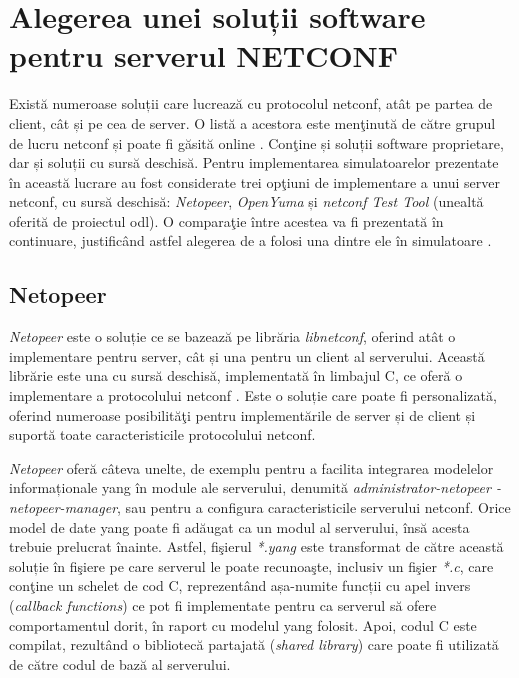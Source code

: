 \section{Alegerea unei soluții software pentru serverul NETCONF}

Există numeroase soluții care lucrează cu protocolul \gls{netconf}, atât pe partea de client, cât și pe cea de server. O listă a acestora este menţinută de către grupul de lucru \gls{netconf} și poate fi găsită online \cite{netconfwiki}. Conţine și soluții software proprietare, dar și soluții cu sursă deschisă. Pentru implementarea simulatoarelor prezentate în această lucrare au fost considerate trei opţiuni de implementare a unui server \gls{netconf}, cu sursă deschisă: \textit{Netopeer}, \textit{OpenYuma} și \textit{\gls{netconf} Test Tool} (unealtă oferită de proiectul \gls{odl}). O comparaţie între acestea va fi prezentată în continuare, justificând astfel alegerea de a folosi una dintre ele în simulatoare \cite{stancu2016comparison}.

\subsection{Netopeer}

\textit{Netopeer} este o soluție ce se bazează pe librăria \textit{libnetconf}, oferind atât o implementare pentru server, cât și una pentru un client al serverului. Această librărie este una cu sursă deschisă, implementată în limbajul C, ce oferă o implementare a protocolului \gls{netconf} \cite{krejci2013building}. Este o soluție care poate fi personalizată, oferind numeroase posibilităţi pentru implementările de server și de client și suportă toate caracteristicile protocolului \gls{netconf}.

\textit{Netopeer} oferă câteva unelte, de exemplu pentru a facilita integrarea modelelor informaționale \gls{yang} în module ale serverului, denumită \textit{administrator-netopeer - netopeer-manager}, sau pentru a configura caracteristicile serverului \gls{netconf}. Orice model de date \gls{yang} poate fi adăugat ca un modul al serverului, însă acesta trebuie prelucrat înainte. Astfel, fişierul \textit{*.yang} este transformat de către această soluție în fişiere pe care serverul le poate recunoaşte, inclusiv un fişier \textit{*.c}, care conţine un schelet de cod C, reprezentând așa-numite funcții cu apel invers (\textit{callback functions}) ce pot fi implementate pentru ca serverul să ofere comportamentul dorit, în raport cu modelul \gls{yang} folosit. Apoi, codul C este compilat, rezultând o bibliotecă partajată (\textit{shared library}) care poate fi utilizată de către codul de bază al serverului.

